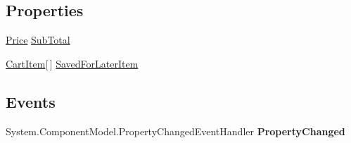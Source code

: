 \subsection*{Properties}
\begin{DoxyCompactItemize}
\item 
\hypertarget{class_amazon___price___finder_1_1amazon_1_1ecs_1_1_saved_for_later_items_aea19b26e5836bea4e0a62fee98779b21}{\hyperlink{class_amazon___price___finder_1_1amazon_1_1ecs_1_1_price}{Price} \hyperlink{class_amazon___price___finder_1_1amazon_1_1ecs_1_1_saved_for_later_items_aea19b26e5836bea4e0a62fee98779b21}{Sub\-Total}}\label{class_amazon___price___finder_1_1amazon_1_1ecs_1_1_saved_for_later_items_aea19b26e5836bea4e0a62fee98779b21}

\begin{DoxyCompactList}\small\item\em \end{DoxyCompactList}\item 
\hypertarget{class_amazon___price___finder_1_1amazon_1_1ecs_1_1_saved_for_later_items_ab1b8c693aa8833134a24bc9883261630}{\hyperlink{class_amazon___price___finder_1_1amazon_1_1ecs_1_1_cart_item}{Cart\-Item}\mbox{[}$\,$\mbox{]} \hyperlink{class_amazon___price___finder_1_1amazon_1_1ecs_1_1_saved_for_later_items_ab1b8c693aa8833134a24bc9883261630}{Saved\-For\-Later\-Item}}\label{class_amazon___price___finder_1_1amazon_1_1ecs_1_1_saved_for_later_items_ab1b8c693aa8833134a24bc9883261630}

\begin{DoxyCompactList}\small\item\em \end{DoxyCompactList}\end{DoxyCompactItemize}
\subsection*{Events}
\begin{DoxyCompactItemize}
\item 
\hypertarget{class_amazon___price___finder_1_1amazon_1_1ecs_1_1_saved_for_later_items_ab967715a32f81364b732ae6b9928cf32}{System.\-Component\-Model.\-Property\-Changed\-Event\-Handler {\bfseries Property\-Changed}}\label{class_amazon___price___finder_1_1amazon_1_1ecs_1_1_saved_for_later_items_ab967715a32f81364b732ae6b9928cf32}

\end{DoxyCompactItemize}


